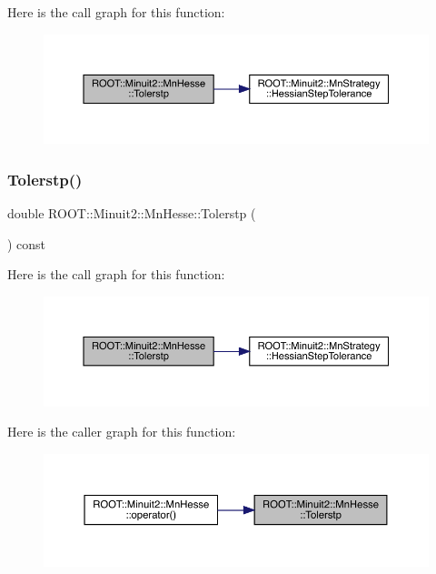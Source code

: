 Here is the call graph for this function\+:
\nopagebreak
\begin{figure}[H]
\begin{center}
\leavevmode
\includegraphics[width=350pt]{d1/d02/classROOT_1_1Minuit2_1_1MnHesse_a4b36474a0d157ecb634bbf5d120db669_cgraph}
\end{center}
\end{figure}
\mbox{\label{classROOT_1_1Minuit2_1_1MnHesse_a4b36474a0d157ecb634bbf5d120db669}} 
\subsubsection{\texorpdfstring{Tolerstp()}{Tolerstp()}\hspace{0.1cm}{\footnotesize\ttfamily [2/2]}}
{\footnotesize\ttfamily double R\+O\+O\+T\+::\+Minuit2\+::\+Mn\+Hesse\+::\+Tolerstp (\begin{DoxyParamCaption}{ }\end{DoxyParamCaption}) const\hspace{0.3cm}{\ttfamily [inline]}}

Here is the call graph for this function\+:
\nopagebreak
\begin{figure}[H]
\begin{center}
\leavevmode
\includegraphics[width=350pt]{d1/d02/classROOT_1_1Minuit2_1_1MnHesse_a4b36474a0d157ecb634bbf5d120db669_cgraph}
\end{center}
\end{figure}
Here is the caller graph for this function\+:\nopagebreak
\begin{figure}[H]
\begin{center}
\leavevmode
\includegraphics[width=350pt]{d1/d02/classROOT_1_1Minuit2_1_1MnHesse_a4b36474a0d157ecb634bbf5d120db669_icgraph}
\end{center}
\end{figure}


